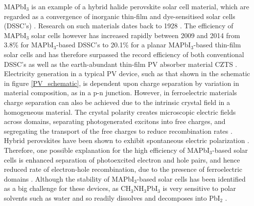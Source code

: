 MAPbI$_3$ is an example of a hybrid halide perovskite solar cell material, which are regarded as a convergence of inorganic thin-film and dye-sensitised solar cells (DSSC's) \cite{Federico}. Research on such materials dates back to 1928 \cite{Jarv_7}. The efficiency of MAPbI$_3$ solar cells however has increased rapidly between 2009 and 2014 from 3.8\% for MAPbI$_3$-based DSSC's to 20.1\% for a planar MAPbI$_3$-based thin-film solar cells \cite{CZTS_vs_MAPI} and has therefore surpassed the record efficiency of both conventional DSSC's as well as the earth-abundant thin-film PV absorber material CZTS \cite{Federico}. Electricity generation in a typical PV device, such as that shown in the schematic in figure \ref{PV_schematic}, is dependent upon charge separation by variation in material composition, as in a p-n junction. However, in ferroelectric materials charge separation can also be achieved due to the intrinsic crystal field in a homogeneous material. The crystal polarity creates microscopic electric fields across domains, separating photogenerated excitons into free charges, and segregating the transport of the free charges to reduce recombination rates \cite{keith}. Hybrid perovskites have been shown to exhibit spontaneous electric polarization \cite{Jarv}.
Therefore, one possible explanation for the high efficiency of MAPbI$_3$-based solar cells is enhanced separation of photoexcited electron and hole pairs, and hence reduced rate of electron-hole recombination, due to the presence of ferroelectric domains \cite{Jarv, Federico}. Although the stability of MAPbI$_3$-based solar cells has been identified as a big challenge for these devices, as CH$_3$NH$_3$PbI$_3$ is very sensitive to polar solvents such as water and so readily dissolves and decomposes into PbI$_2$ \cite{MAPI}. \\

